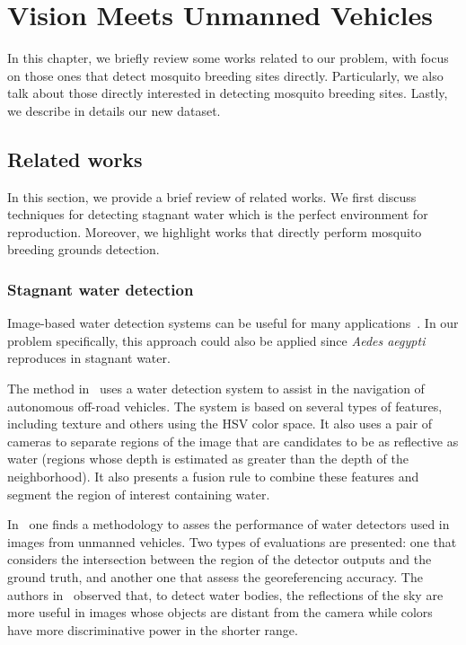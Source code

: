 \chapter{Vision Meets Unmanned Vehicles}
\label{chap:database}

In this chapter, we briefly review some works related to our problem, with focus on those ones that detect mosquito breeding sites directly.
Particularly, we also talk about those directly interested in detecting mosquito breeding sites.
Lastly, we describe in details our new dataset.

\section{Related works}\label{sec:trab_rel}
In this section, we provide a brief review of related works.
We first discuss techniques for detecting stagnant water which is the perfect environment for \Aedes reproduction.
Moreover, we highlight works that directly perform mosquito breeding grounds detection.

%
\subsection{Stagnant water detection}
Image-based water detection systems can be useful for many applications~\cite{Rankin2006, Rankin2010a, Rankin2010b, Zhang2010b, Rankin2011a, Santana2012a, Zhong2013a}.
In our problem specifically, this approach could also be applied since \textit{Aedes aegypti} reproduces in stagnant water.

The method in~\cite{Rankin2006} uses a water detection system to assist in the navigation of autonomous off-road vehicles.
The system is based on several types of features, including texture and others using the HSV color space.
It also uses a pair of cameras to separate regions of the image that are candidates to be as reflective as water (regions whose depth is estimated as greater than the depth of the neighborhood).
It also presents a fusion rule to combine these features and segment the region of interest containing water.

In~\cite{Rankin2010a} one finds a methodology to asses the performance of water detectors used in images from unmanned vehicles.
Two types of evaluations are presented: one that considers the intersection between the region of the detector outputs and the ground truth, and another one that assess the georeferencing accuracy.
The authors in~\cite{Rankin2010b} observed that, to detect water bodies, the reflections of the sky are more useful in images whose objects are distant from the camera while colors have more discriminative power in the shorter range.

